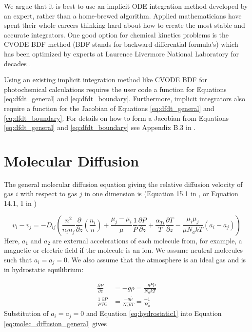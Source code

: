 We argue that it is best to use an implicit ODE integration method developed by an expert, rather than a home-brewed algorithm. Applied mathematicians have spent their whole careers thinking hard about how to create the most stable and accurate integrators. One good option for chemical kinetics problems is the CVODE BDF method (BDF stands for backward differential formula's) which has been optimized by experts at Laurence Livermore National Laboratory for decades \citep{Hindmarsh_2005}.

Using an existing implicit integration method like CVODE BDF for photochemical calculations requires the user code a function for Equations \eqref{eq:dfdt_general} and \eqref{eq:dfdt_boundary}. Furthermore, implicit integrators also require a function for the Jacobian of Equations \eqref{eq:dfdt_general} and \eqref{eq:dfdt_boundary}. For details on how to form a Jacobian from Equations \eqref{eq:dfdt_general} and \eqref{eq:dfdt_boundary} see Appendix B.3 in \citet{Catling_2017}.

\section{Molecular Diffusion} \label{sec:molecular_diffusion}

The general molecular diffusion equation giving the relative diffusion velocity of gas $i$ with respect to gas $j$ in one dimension is (Equation 15.1 in \citet{Banks_2013}, or Equation 14.1, 1 in \citet{Chapman_1990})

\begin{equation} \label{eq:molec_diffusion_general}
  v_i - v_j = -D_{ij} \left( \frac{n^2}{n_i n_j} \frac{\partial}{\partial z} \left(\frac{n_i}{n}\right) + \frac{\mu_j - \mu_i}{\overline{\mu}} \frac{1}{P} \frac{\partial P}{\partial z} + \frac{\alpha_{Ti}}{T} \frac{\partial T}{\partial z} - \frac{\mu_i \mu_j}{\overline{\mu} N_a k T} (a_i - a_j)\right)
\end{equation}
Here, $a_1$ and $a_2$ are external accelerations of each molecule from, for example, a magnetic or electric field if the molecule is an ion. We assume neutral molecules such that $a_i = a_j = 0$. We also assume that the atmosphere is an ideal gas and is in hydrostatic equilibrium:

\begin{align} 
  \frac{\partial P}{\partial z} &= -g \rho = \frac{-g P \overline{\mu}}{N_a k T} \\
  \frac{1}{P}\frac{\partial P}{\partial z} &= \frac{-g \overline{\mu}}{N_a k T} = \frac{-1}{H_a} \label{eq:hydrostatic1}
\end{align}
Substitution of $a_i = a_j = 0$ and Equation \eqref{eq:hydrostatic1} into Equation \eqref{eq:molec_diffusion_general} gives


